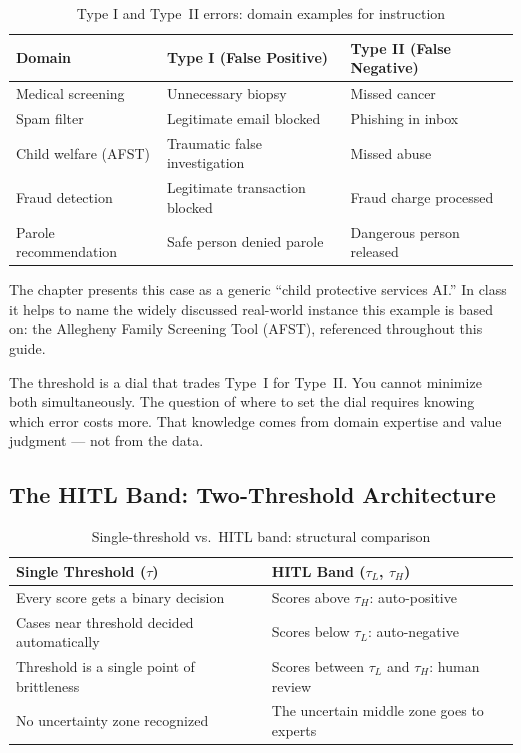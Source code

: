 \begin{table}[htbp]
\caption{Type I and Type~II errors: domain examples for instruction}
\label{tab:error-types-ch04}
\centering
\begin{tabular}{@{}p{3.5cm}p{3.5cm}p{3.5cm}@{}}
\toprule
\textbf{Domain} & \textbf{Type I (False Positive)} & \textbf{Type II (False Negative)} \\
\midrule
Medical screening & Unnecessary biopsy & Missed cancer \\
Spam filter & Legitimate email blocked & Phishing in inbox \\
Child welfare (AFST) & Traumatic false investigation & Missed abuse \\
Fraud detection & Legitimate transaction blocked & Fraud charge processed \\
Parole recommendation & Safe person denied parole & Dangerous person released \\
\bottomrule
\end{tabular}
\end{table}

\begin{technote}
The chapter presents this case as a generic ``child protective services AI.'' In class it helps to name the widely discussed real-world instance this example is based on: the Allegheny Family Screening Tool (AFST), referenced throughout this guide.
\end{technote}

\begin{keyconcept}
The threshold is a dial that trades Type~I for Type~II. You cannot minimize both simultaneously. The question of where to set the dial requires knowing which error costs more. That knowledge comes from domain expertise and value judgment --- not from the data.
\end{keyconcept}

\subsection{The HITL Band: Two-Threshold Architecture}

\begin{table}[htbp]
\caption{Single-threshold vs.\ HITL band: structural comparison}
\label{tab:hitl-band-ch04}
\centering
\begin{tabular}{@{}p{4cm}p{5.5cm}@{}}
\toprule
\textbf{Single Threshold ($\tau$)} & \textbf{HITL Band ($\tau_L$, $\tau_H$)} \\
\midrule
Every score gets a binary decision & Scores above $\tau_H$: auto-positive \\
Cases near threshold decided automatically & Scores below $\tau_L$: auto-negative \\
Threshold is a single point of brittleness & Scores between $\tau_L$ and $\tau_H$: human review \\
No uncertainty zone recognized & The uncertain middle zone goes to experts \\
\bottomrule
\end{tabular}
\end{table}

